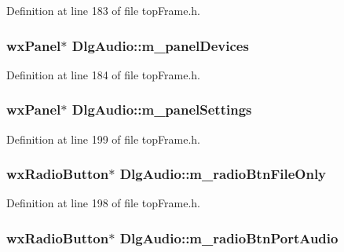 Definition at line 183 of file top\-Frame.\-h.

\hypertarget{class_dlg_audio_a74808776e03014a3b3dcbf03bb8f6dbe}{
\subsubsection[{m\-\_\-panel\-Devices}]{\setlength{\rightskip}{0pt plus 5cm}wx\-Panel$\ast$ Dlg\-Audio\-::m\-\_\-panel\-Devices\hspace{0.3cm}{\ttfamily [protected]}}}\label{class_dlg_audio_a74808776e03014a3b3dcbf03bb8f6dbe}


Definition at line 184 of file top\-Frame.\-h.

\hypertarget{class_dlg_audio_acfc12b7c79d7b058f6702d13d5663f70}{
\subsubsection[{m\-\_\-panel\-Settings}]{\setlength{\rightskip}{0pt plus 5cm}wx\-Panel$\ast$ Dlg\-Audio\-::m\-\_\-panel\-Settings\hspace{0.3cm}{\ttfamily [protected]}}}\label{class_dlg_audio_acfc12b7c79d7b058f6702d13d5663f70}


Definition at line 199 of file top\-Frame.\-h.

\hypertarget{class_dlg_audio_abbbc7d86cca84f89c78c16b9b6d3b793}{
\subsubsection[{m\-\_\-radio\-Btn\-File\-Only}]{\setlength{\rightskip}{0pt plus 5cm}wx\-Radio\-Button$\ast$ Dlg\-Audio\-::m\-\_\-radio\-Btn\-File\-Only\hspace{0.3cm}{\ttfamily [protected]}}}\label{class_dlg_audio_abbbc7d86cca84f89c78c16b9b6d3b793}


Definition at line 198 of file top\-Frame.\-h.

\hypertarget{class_dlg_audio_a44c3e54a014e7a4e921398bddc6681c7}{
\subsubsection[{m\-\_\-radio\-Btn\-Port\-Audio}]{\setlength{\rightskip}{0pt plus 5cm}wx\-Radio\-Button$\ast$ Dlg\-Audio\-::m\-\_\-radio\-Btn\-Port\-Audio\hspace{0.3cm}{\ttfamily [protected]}}}\label{class_dlg_audio_a44c3e54a014e7a4e921398bddc6681c7}


